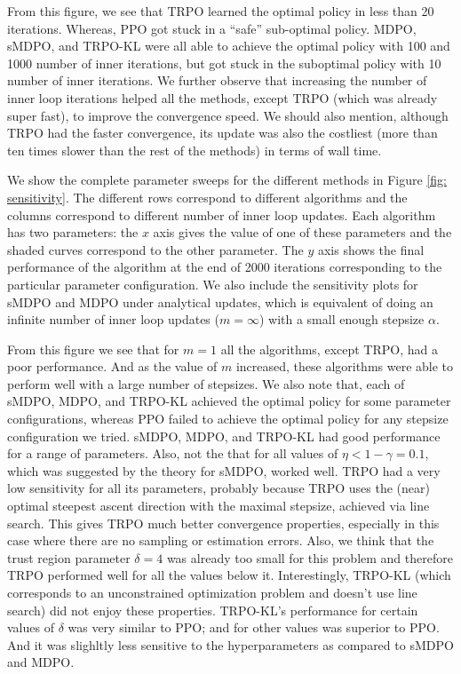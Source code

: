\documentclass[a4paper, 10pt]{article}
\begin{document}
From this figure, we see that TRPO learned the optimal policy in less than 20 iterations. Whereas, PPO got stuck in a ``safe'' sub-optimal policy. MDPO, sMDPO, and TRPO-KL were all able to achieve the optimal policy with 100 and 1000 number of inner iterations, but got stuck in the suboptimal policy with 10 number of inner iterations. We further observe that increasing the number of inner loop iterations helped all the methods, except TRPO (which was already super fast), to improve the convergence speed. We should also mention, although TRPO had the faster convergence, its update was also the costliest (more than ten times slower than the rest of the methods) in terms of wall time. 

We show the complete parameter sweeps for the different methods in Figure \ref{fig: sensitivity}. The different rows correspond to different algorithms and the columns correspond to different number of inner loop updates. Each algorithm has two parameters: the $x$ axis gives the value of one of these parameters and the shaded curves correspond to the other parameter. The $y$ axis shows the final performance of the algorithm at the end of 2000 iterations corresponding to the particular parameter configuration. We also include the sensitivity plots for sMDPO and MDPO under analytical updates, which is equivalent of doing an infinite number of inner loop updates ($m = \infty$) with a small enough stepsize $\alpha$.

From this figure we see that for $m=1$ all the algorithms, except TRPO, had a poor performance. And as the value of $m$ increased, these algorithms were able to perform well with a large number of stepsizes. We also note that, each of sMDPO, MDPO, and TRPO-KL achieved the optimal policy for some parameter configurations, whereas PPO failed to achieve the optimal policy for any stepsize configuration we tried. sMDPO, MDPO, and TRPO-KL had good performance for a range of parameters. Also, not the that for all values of $\eta < 1 - \gamma = 0.1$, which was suggested by the theory for sMDPO, worked well. TRPO had a very low sensitivity for all its parameters, probably because TRPO uses the (near) optimal steepest ascent direction with the maximal stepsize, achieved via line search. This gives TRPO much better convergence properties, especially in this case where there are no sampling or estimation errors. Also, we think that the trust region parameter $\delta = 4$ was already too small for this problem and therefore TRPO performed well for all the values below it. Interestingly, TRPO-KL (which corresponds to an unconstrained optimization problem and doesn't use line search) did not enjoy these properties. TRPO-KL's performance for certain values of $\delta$ was very similar to PPO; and for other values was superior to PPO. And it was slighltly less sensitive to the hyperparameters as compared to sMDPO and MDPO.
\end{document}
